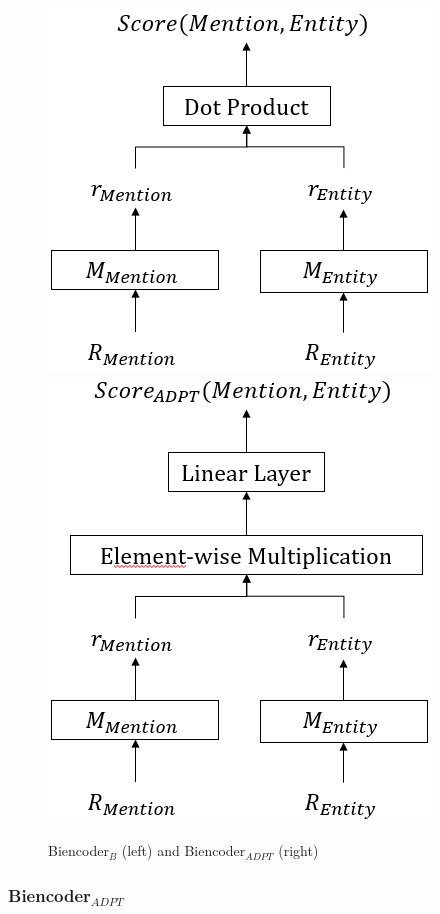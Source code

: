 \documentclass{report}
\theoremstyle{definition}
\theoremstyle{remark}
\begin{document}
\begin{figure}[H]
    \centering
    \includegraphics[scale=0.65]{BiencoderB.png}
    \hspace{1.5cm}
    \includegraphics[scale=0.65]{BiencoderADPT.png}
    \caption{Biencoder$_{B}$ (left) and Biencoder$_{ADPT}$ (right)}
    \label{fig:biencoderB}
\end{figure}

\subsubsection{Biencoder$_{ADPT}$}
\label{sec:biencoderadaptexplanation}
\end{document}
